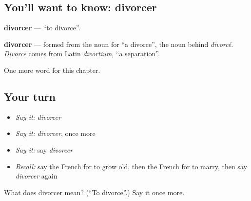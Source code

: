 \subsection*{You'll want to know: divorcer}
\textbf{divorcer} — \textquotedblleft{}to divorce\textquotedblright{}.

\begin{cousinweb}
\textbf{divorcer} — formed from the noun for \textquotedblleft{}a divorce\textquotedblright{}, the noun behind \emph{divorcé}. \emph{Divorce} comes from Latin \emph{dīvortium}, \textquotedblleft{}a separation\textquotedblright{}.
\end{cousinweb}

\begin{grammarlens}[title={What you've built}]
One more word for this chapter.
\end{grammarlens}

\subsection*{Your turn}
\begin{itemize}
\raggedright
  \item \emph{Say it:} \emph{divorcer}
  \item \emph{Say it:} \emph{divorcer}, once more
  \item \emph{Say it:} say \emph{divorcer}
  \item \emph{Recall:} say the French for to grow old, then the French for to marry, then say \emph{divorcer} again
\end{itemize}

\begin{tcolorbox}[breakable,colback=teal!4,colframe=teal!35!black,title={Before you move on}]
What does divorcer mean? (\textquotedblleft{}To divorce\textquotedblright{}.) Say it once more.
\end{tcolorbox}
